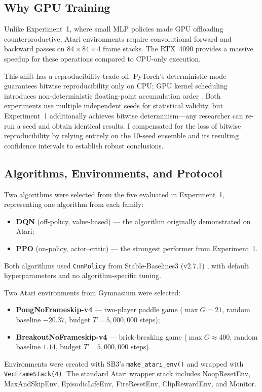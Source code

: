 \subsection{Why GPU Training}
\label{sec:why-gpu}

Unlike Experiment~1, where small MLP policies made GPU offloading
counterproductive, Atari environments require convolutional forward
and backward passes on $84\times84\times4$ frame stacks. The RTX~4090
provides a massive speedup for these operations compared to CPU-only
execution.

This shift has a reproducibility trade-off. PyTorch's deterministic
mode guarantees bitwise reproducibility only on CPU; GPU kernel
scheduling introduces non-deterministic floating-point accumulation
order \citep{pytorch_reproducibility}. Both experiments use multiple
independent seeds for statistical validity, but Experiment~1
additionally achieves bitwise determinism---any researcher can re-run a
seed and obtain identical results. I compensated for the loss of bitwise
reproducibility by relying entirely on the 10-seed ensemble and its
resulting confidence intervals to establish robust conclusions.

\subsection{Algorithms, Environments, and Protocol}
\label{sec:atari-protocol}

Two algorithms were selected from the five evaluated in Experiment~1,
representing one algorithm from each family:
\begin{itemize}
  \item \textbf{DQN} (off-policy, value-based) \citep{mnih2015human}
        --- the algorithm originally demonstrated on Atari;
  \item \textbf{PPO} (on-policy, actor--critic)
        \citep{schulman2017ppo} --- the strongest performer from
        Experiment~1.
\end{itemize}
Both algorithms used \texttt{CnnPolicy} from Stable-Baselines3
(v2.7.1) \citep{raffin2021sb3}, with default hyperparameters and no
algorithm-specific tuning.

Two Atari environments from Gymnasium were selected:
\begin{itemize}
  \item \textbf{PongNoFrameskip-v4} --- two-player paddle game
        ($\max G = 21$, random baseline $-20.37$,
        budget $T = 5{,}000{,}000$ steps);
  \item \textbf{BreakoutNoFrameskip-v4} --- brick-breaking game
        ($\max G \approx 400$, random baseline $1.14$,
        budget $T = 5{,}000{,}000$ steps).
\end{itemize}
Environments were created with SB3's \texttt{make\_atari\_env()} and
wrapped with \texttt{VecFrameStack(4)}. The standard Atari wrapper
stack includes NoopResetEnv, MaxAndSkipEnv, EpisodicLifeEnv,
FireResetEnv, ClipRewardEnv, and Monitor.

